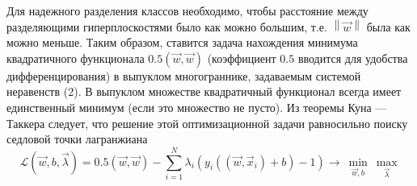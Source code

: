 Для надежного разделения классов необходимо, чтобы расстояние между разделяющими гиперплоскостями было как можно большим, т.е. $\left\| {\vec{w}} \right\|$ была как можно меньше. Таким образом, ставится задача нахождения минимума квадратичного функционала $0.5({\vec{w}},{\vec{w}})$ (коэффициент $0.5$ вводится для удобства дифференцирования) в выпуклом многограннике, задаваемым системой неравенств (2). В выпуклом множестве квадратичный функционал всегда имеет единственный минимум (если это множество не пусто). Из теоремы Куна — Таккера следует, что решение этой оптимизационной задачи равносильно поиску седловой точки лагранжиана
$$\mathcal L({\vec{w}},b,{\vec{\lambda }}) = 0.5({\vec{w}},{\vec{w}}) - \sum\limits_{i = 1}^N {\lambda _i (y_i (({\vec{w}},{\vec{x}}_i ) + b) - 1)}  \to \ \min \limits_{{\vec{w}},b} \ \max\limits_{\vec{\lambda }}$$

